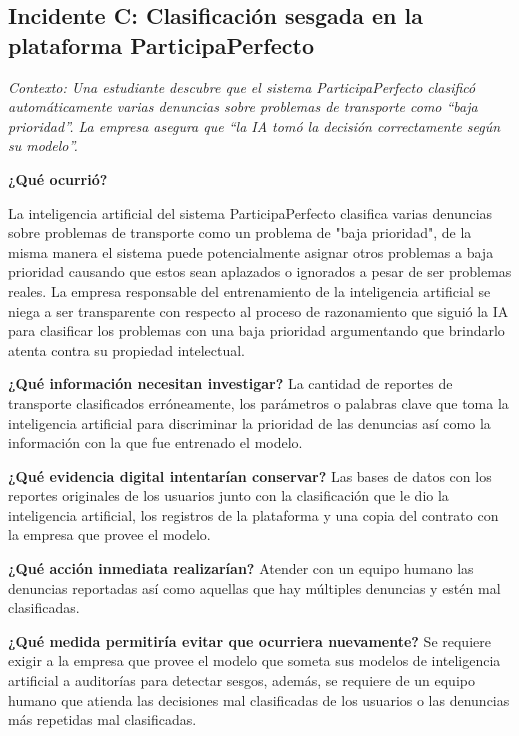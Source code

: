 \subsection*{Incidente C: Clasificación sesgada en la plataforma ParticipaPerfecto}
\textit{Contexto: Una estudiante descubre que el sistema ParticipaPerfecto clasificó automáticamente varias denuncias sobre problemas de transporte como ``baja prioridad''. La empresa asegura que ``la IA tomó la decisión correctamente según su modelo''.}

\begin{enumerateColor}
    \item \textbf{¿Qué ocurrió?}

    La inteligencia artificial del sistema ParticipaPerfecto clasifica varias denuncias sobre problemas de transporte como un problema de "baja prioridad", de la misma manera el sistema puede potencialmente asignar otros problemas a baja prioridad causando que estos sean aplazados o ignorados a pesar de ser problemas reales. La empresa responsable del entrenamiento de la inteligencia artificial se niega a ser transparente con respecto al proceso de razonamiento que siguió la IA para clasificar los problemas con una baja prioridad argumentando que brindarlo atenta contra su propiedad intelectual.

    \item \textbf{¿Qué información necesitan investigar?}
    La cantidad de reportes de transporte clasificados erróneamente, los parámetros o palabras clave que toma la inteligencia artificial para discriminar la prioridad de las denuncias así como la información con la que fue entrenado el modelo.
    \item \textbf{¿Qué evidencia digital intentarían conservar?}
	Las bases de datos con los reportes originales de los usuarios junto con la clasificación que le dio la inteligencia artificial, los registros de la plataforma y una copia del contrato con la empresa que provee el modelo.
    \item \textbf{¿Qué acción inmediata realizarían?}
	    Atender con un equipo humano las denuncias reportadas así como aquellas que hay múltiples denuncias y estén mal clasificadas.

    \item \textbf{¿Qué medida permitiría evitar que ocurriera nuevamente?}
	    Se requiere exigir a la empresa que provee el modelo que someta sus modelos de inteligencia artificial a auditorías para detectar sesgos, además, se requiere de un equipo humano que atienda las decisiones mal clasificadas de los usuarios o las denuncias más repetidas mal clasificadas. 
\end{enumerateColor}
